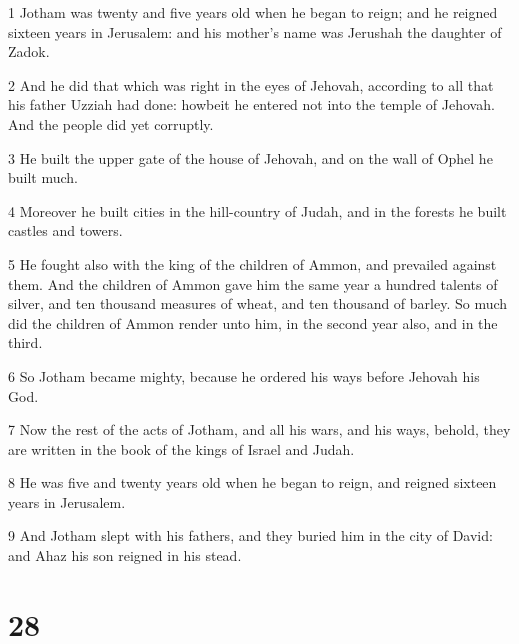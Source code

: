 \par 1 Jotham was twenty and five years old when he began to reign; and he reigned sixteen years in Jerusalem: and his mother's name was Jerushah the daughter of Zadok.
\par 2 And he did that which was right in the eyes of Jehovah, according to all that his father Uzziah had done: howbeit he entered not into the temple of Jehovah. And the people did yet corruptly.
\par 3 He built the upper gate of the house of Jehovah, and on the wall of Ophel he built much.
\par 4 Moreover he built cities in the hill-country of Judah, and in the forests he built castles and towers.
\par 5 He fought also with the king of the children of Ammon, and prevailed against them. And the children of Ammon gave him the same year a hundred talents of silver, and ten thousand measures of wheat, and ten thousand of barley. So much did the children of Ammon render unto him, in the second year also, and in the third.
\par 6 So Jotham became mighty, because he ordered his ways before Jehovah his God.
\par 7 Now the rest of the acts of Jotham, and all his wars, and his ways, behold, they are written in the book of the kings of Israel and Judah.
\par 8 He was five and twenty years old when he began to reign, and reigned sixteen years in Jerusalem.
\par 9 And Jotham slept with his fathers, and they buried him in the city of David: and Ahaz his son reigned in his stead.

\chapter{28}

